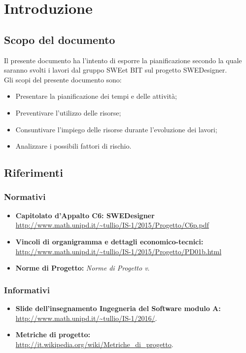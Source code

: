 \section{Introduzione}
\subsection{Scopo del documento}
Il presente documento ha l'intento di esporre la pianificazione secondo la quale saranno svolti i lavori dal gruppo SWEet BIT sul progetto SWEDesigner. \\
Gli scopi del presente documento sono: \\
\begin{itemize}
	\item Presentare la pianificazione dei tempi e delle attività;
	\item Preventivare l'utilizzo delle risorse;
	\item Consuntivare l'impiego delle risorse durante l'evoluzione dei lavori;
	\item Analizzare i possibili fattori di rischio. \\
\end{itemize}
\subsection{Riferimenti}
\subsubsection{Normativi}
\begin{itemize}
	\item \textbf{Capitolato d'Appalto C6: SWEDesigner} \\
		\url{http://www.math.unipd.it/~tullio/IS-1/2015/Progetto/C6p.pdf} \\
	\item \textbf{Vincoli di organigramma e dettagli economico-tecnici:} \\
		\url{http://www.math.unipd.it/~tullio/IS-1/2015/Progetto/PD01b.html} \\
	\item \textbf{Norme di Progetto:} \textit{Norme di Progetto v\VersioneNP}. \\
\end{itemize}
\subsubsection{Informativi}
\begin{itemize}
	\item \textbf{Slide dell'insegnamento Ingegneria del Software modulo A:} \\
		\url{http://www.math.unipd.it/~tullio/IS-1/2016/}. \\
	\item \textbf{Metriche di progetto:} \\
		\url{http://it.wikipedia.org/wiki/Metriche_di_progetto}. \\
\end{itemize}
